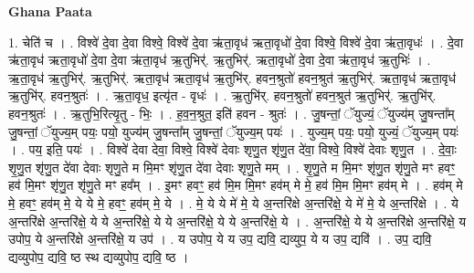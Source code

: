\documentclass[17pt]{extarticle}
\begin{document}
\textbf{Ghana Paata } \newline

1. चेति॑ च । . विश्वे॑ दे॒वा दे॒वा विश्वे॒ विश्वे॑ दे॒वा ऋ॑ता॒वृध॑ ऋता॒वृधो॑ दे॒वा विश्वे॒ विश्वे॑ दे॒वा ऋ॑ता॒वृधः॑ । . दे॒वा ऋ॑ता॒वृध॑ ऋता॒वृधो॑ दे॒वा दे॒वा ऋ॑ता॒वृध॑ ऋ॒तुभिर्॑. ऋ॒तुभिर्॑. ऋता॒वृधो॑ दे॒वा दे॒वा ऋ॑ता॒वृध॑ ऋ॒तुभिः॑ । . ऋ॒ता॒वृध॑ ऋ॒तुभिर्॑. ऋ॒तुभिर्॑. ऋता॒वृध॑ ऋता॒वृध॑ ऋ॒तुभि॑र्. हवन॒श्रुतो॑ हवन॒श्रुत॑ ऋ॒तुभिर्॑. ऋता॒वृध॑ ऋता॒वृध॑ ऋ॒तुभि॑र्. हवन॒श्रुतः॑ । . ऋ॒ता॒वृध॒ इत्यृ॑त - वृधः॑ । . ऋ॒तुभि॑र्. हवन॒श्रुतो॑ हवन॒श्रुत॑ ऋ॒तुभिर्॑. ऋ॒तुभि॑र्. हवन॒श्रुतः॑ । . ऋ॒तुभि॒रित्यृ॒तु - भिः॒ । . ह॒व॒न॒श्रुत॒ इति॑ हवन - श्रुतः॑ । . जु॒षन्तां॒ ॅयुज्यं॒ ॅयुज्य॑म् जु॒षन्ता᳚म् जु॒षन्तां॒ ॅयुज्य॒म् पयः॒ पयो॒ युज्य॑म् जु॒षन्ता᳚म् जु॒षन्तां॒ ॅयुज्य॒म् पयः॑ । . युज्य॒म् पयः॒ पयो॒ युज्यं॒ ॅयुज्य॒म् पयः॑ । . पय॒ इति॒ पयः॑ । . विश्वे॑ देवा देवा॒ विश्वे॒ विश्वे॑ देवाः शृणु॒त शृ॑णु॒त दे॑वा॒ विश्वे॒ विश्वे॑ देवाः शृणु॒त । . दे॒वाः॒ शृ॒णु॒त शृ॑णु॒त दे॑वा देवाः शृणु॒ते म मि॒मꣳ शृ॑णु॒त दे॑वा देवाः शृणु॒ते मम् । . शृ॒णु॒ते म मि॒मꣳ शृ॑णु॒त शृ॑णु॒ते मꣳ हवꣳ॒॒ हव॑ मि॒मꣳ शृ॑णु॒त शृ॑णु॒ते मꣳ हव᳚म् । . इ॒मꣳ हवꣳ॒॒ हव॑ मि॒म मि॒मꣳ हव॑म् मे मे॒ हव॑ मि॒म मि॒मꣳ हव॑म् मे । . हव॑म् मे मे॒ हवꣳ॒॒ हव॑म् मे॒ ये ये मे॒ हवꣳ॒॒ हव॑म् मे॒ ये । . मे॒ ये ये मे॑ मे॒ ये अ॒न्तरि॑क्षे अ॒न्तरि॑क्षे॒ ये मे॑ मे॒ ये अ॒न्तरि॑क्षे । . ये अ॒न्तरि॑क्षे अ॒न्तरि॑क्षे॒ ये ये अ॒न्तरि॑क्षे॒ ये ये अ॒न्तरि॑क्षे॒ ये ये अ॒न्तरि॑क्षे॒ ये । . अ॒न्तरि॑क्षे॒ ये ये अ॒न्तरि॑क्षे अ॒न्तरि॑क्षे॒ य उपोप॒ ये अ॒न्तरि॑क्षे अ॒न्तरि॑क्षे॒ य उप॑ । . य उपोप॒ ये य उप॒ द्यवि॒ द्यव्युप॒ ये य उप॒ द्यवि॑ । . उप॒ द्यवि॒ द्यव्युपोप॒ द्यवि॒ ष्ठ स्थ द्यव्युपोप॒ द्यवि॒ ष्ठ । \newline
\end{document}
